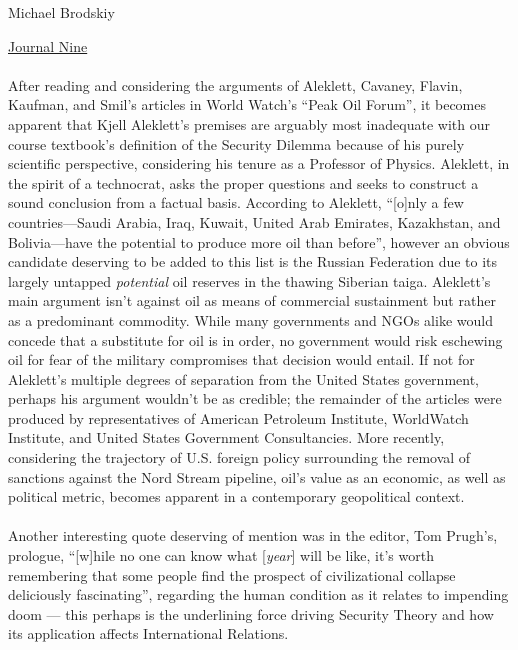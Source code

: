 \documentclass[12pt]{article}
\begin{document}
\flushleft Michael Brodskiy

\begin{center}

 \underline{Journal Nine}

\end{center}

\begin{justify}
  \paragraph{} After reading and considering the arguments of Aleklett, Cavaney, Flavin, Kaufman, and Smil's articles in World Watch's “Peak Oil Forum”, it becomes apparent that Kjell Aleklett's premises are arguably most inadequate with our course textbook's definition of the Security Dilemma because of his purely scientific perspective, considering his tenure as a Professor of Physics. Aleklett, in the spirit of a technocrat, asks the proper questions and seeks to construct a sound conclusion from a factual basis. According to Aleklett, “[o]nly a few countries—Saudi Arabia, Iraq, Kuwait, United Arab Emirates, Kazakhstan, and Bolivia—have the potential to produce more oil than before”, however an obvious candidate deserving to be added to this list is the Russian Federation due to its largely untapped \emph{potential} oil reserves in the thawing Siberian taiga. Aleklett's main argument isn't against oil as means of commercial sustainment but rather as a predominant commodity. While many governments and NGOs alike would concede that a substitute for oil is in order, no government would risk eschewing oil for fear of the military compromises that decision would entail. If not for Aleklett's multiple degrees of separation from the United States government, perhaps his argument wouldn't be as credible; the remainder of the articles were produced by representatives of American Petroleum Institute, WorldWatch Institute, and United States Government Consultancies. More recently, considering the trajectory of U.S. foreign policy surrounding the removal of sanctions against the Nord Stream pipeline, oil's value as an economic, as well as political metric, becomes apparent in a contemporary geopolitical context. 
  \indent\paragraph{} Another interesting quote deserving of mention was in the editor, Tom Prugh's, prologue, “[w]hile no one can know what [\emph{year}] will be like, it's worth remembering that some people find the prospect of civilizational collapse deliciously fascinating”, regarding the human condition as it relates to impending doom — this perhaps is the underlining force driving Security Theory and how its application affects International Relations.
\end{justify}
\end{document}

